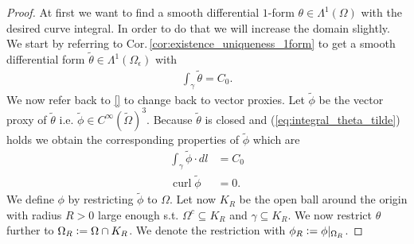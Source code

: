\documentclass[12pt,a4paper]{article}
\numberwithin{equation}{subsection}
\numberwithin{lemma}{subsection}
\theoremstyle{definition}
\DeclareMathOperator{\curl}{curl}
\begin{document}
\begin{proof}
    At first we want to find a smooth differential $1$-form 
    $\theta \in \Lambda^1(\Omega)$ with the desired curve integral. 
    In order to do that we will increase the 
    domain slightly.
    We start by referring to Cor.\,\ref{cor:existence_uniqueness_1form} 
    to get a smooth differential form 
    $\tilde{\theta} \in \Lambda^1(\Omega_\epsilon)$ with 
    \begin{align}
        \int_\gamma \tilde{\theta} = C_0. \label{eq:integral_theta_tilde}
    \end{align}
    We now refer back to \ref{} to change back to vector proxies. Let 
    $\tilde{\phi}$ be the vector proxy of $\tilde{\theta}$ 
    i.e. $\tilde{\phi} \in C^\infty(\tilde{\Omega})^3$.
    Because $\tilde{\theta}$ is closed and (\ref{eq:integral_theta_tilde}) holds
    we obtain the corresponding properties 
    of $\tilde{\phi}$ which are 
    \begin{align*}
        \int_\gamma \tilde{\phi} \cdot dl &= C_0 
        \\ \curl \tilde{\phi} &= 0.
    \end{align*}
    We define $\phi$ by restricting $\tilde{\phi}$ to $\Omega$. 
    Let now $K_R$ be the open ball around the origin with radius $R>0$ large
    enough s.t. $\Omega^c \subseteq K_R$ and $\gamma \subseteq K_R$. 
    We now restrict $\theta$ further to
    $\Omega_R \vcentcolon= \Omega \cap K_R$. We denote the restriction with 
    $\phi_R \vcentcolon= \phi|_{\Omega_R}$. 


\end{proof}
\end{document}
